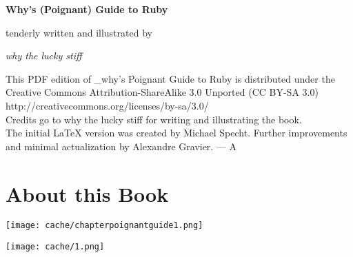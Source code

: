 \documentclass[12pt,twoside]{report}
\renewcommand{\headrulewidth}{0.25pt}
\renewcommand{\headrulewidth}{0pt}
\begin{document}
\pagestyle{empty}
\begin{titlepage}
\begin{center}
\vspace*{2cm}
\normalfont\noindent\bf\Huge{Why's (Poignant) Guide to Ruby}

\vfill

\normalfont\noindent\large{tenderly written and illustrated by}

\vspace*{-0.2cm}

\normalfont\noindent\large{\em why the lucky stiff}
\end{center}
\end{titlepage}
\newpage
\thispagestyle{empty}
\mbox{}

\newpage
\pagestyle{empty}
\begin{center}
\vspace*{4cm}
This PDF edition of \_why's Poignant Guide to Ruby is distributed
under the Creative Commons Attribution-ShareAlike 3.0 Unported 
(CC BY-SA 3.0)
\vfill
http://creativecommons.org/licenses/by-sa/3.0/ \\
Credits go to why the lucky stiff for writing and illustrating the
book.\\
The initial LaTeX version was created by Michael Specht. Further
improvements and minimal actualization by Alexandre Gravier.
\hspace{8.5cm}--- A
\vspace{5cm}
\end{center}
\newpage
\thispagestyle{empty}
\mbox{}

\cleartoevenpage
\setcounter{page}{2}
\setcounter{tocdepth}{1}
\setcounter{secnumdepth}{2}
\begin{spacing}{1.135}
\tableofcontents
\end{spacing}

\newpage

\thispagestyle{empty}

\pagestyle{fancy}

 {
  \renewcommand{\headrulewidth}{0.25pt}
  \fancyhf{}
  \fancyhead[EL,OR]{\thepage}
}
\cleartooddpage


\chapter{About this Book}
\vfill
\begin{center}
  \texttt{[image: cache/chapterpoignantguide1.png]}
\end{center}
\vspace{2cm}
\newpage
\thispagestyle{empty}
\mbox{}
\clearpage
	\texttt{[image: cache/1.png]} 
\end{document}
